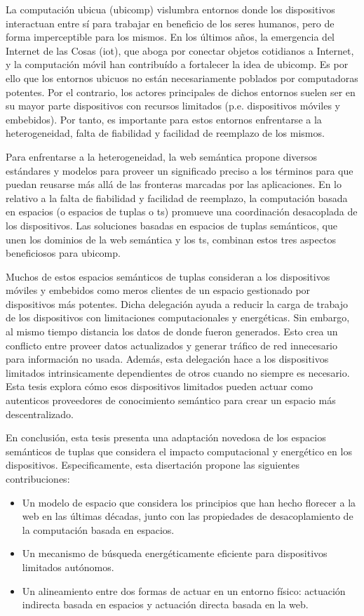 \begin{resumen}        %
La computación ubicua (\acs{ubicomp}) vislumbra entornos donde los dispositivos interactuan entre sí para trabajar en beneficio de los seres humanos, pero de forma imperceptible para los mismos.
En los últimos años, la emergencia del Internet de las Cosas (\acs{iot}), que aboga por conectar objetos cotidianos a Internet, y la computación móvil han contribuído a fortalecer la idea de \ac{ubicomp}.
Es por ello que los entornos ubicuos no están necesariamente poblados por computadoras potentes.
Por el contrario, los actores principales de dichos entornos suelen ser en su mayor parte dispositivos con recursos limitados (p.e. dispositivos móviles y embebidos).
Por tanto, es importante para estos entornos enfrentarse a la heterogeneidad, falta de fiabilidad y facilidad de reemplazo de los mismos.


Para enfrentarse a la heterogeneidad, la web semántica propone diversos estándares y modelos para proveer un significado preciso a los términos para que puedan reusarse más allá de las fronteras marcadas por las aplicaciones.
En lo relativo a la falta de fiabilidad y facilidad de reemplazo, la computación basada en espacios (o espacios de tuplas o \acl{ts}) promueve una coordinación desacoplada de los dispositivos.
Las soluciones basadas en espacios de tuplas semánticos, que unen los dominios de la web semántica y los \acl{ts}, combinan estos tres aspectos beneficiosos para \ac{ubicomp}.


Muchos de estos espacios semánticos de tuplas consideran a los dispositivos móviles y embebidos como meros clientes de un espacio gestionado por dispositivos más potentes.
Dicha delegación ayuda a reducir la carga de trabajo de los dispositivos con limitaciones computacionales y energéticas.
Sin embargo, al mismo tiempo distancia los datos de donde fueron generados.
Esto crea un conflicto entre proveer datos actualizados y generar tráfico de red innecesario para información no usada.
Además, esta delegación hace a los dispositivos limitados intrinsicamente dependientes de otros cuando no siempre es necesario.
Esta tesis explora cómo esos dispositivos limitados pueden actuar como autenticos proveedores de conocimiento semántico para crear un espacio más descentralizado.


En conclusión, esta tesis presenta una adaptación novedosa de los espacios semánticos de tuplas que considera el impacto computacional y energético en los dispositivos.
Especificamente, esta disertación propone las siguientes contribuciones:
\begin{itemize}
  \item Un modelo de espacio que considera los principios que han hecho florecer a la web en las últimas décadas, junto con las propiedades de desacoplamiento de la computación basada en espacios.
  \item Un mecanismo de búsqueda energéticamente eficiente para dispositivos limitados autónomos.
  \item Un alineamiento entre dos formas de actuar en un entorno físico: actuación indirecta basada en espacios y actuación directa basada en la web.
\end{itemize}


\end{resumen}
